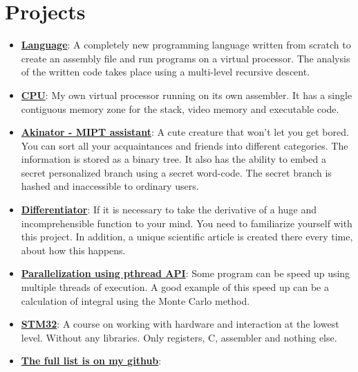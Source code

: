 \documentclass{resume}
\newcommand{\resumeItem}[2]{
  \item\small{
    \textbf{#1}{: #2 \vspace{-2pt}}
  }
}
\newcommand{\resumeSubItem}[2]{\resumeItem{#1}{#2}\vspace{-4pt}}
\newcommand{\resumeSubHeadingListStart}{\begin{itemize}[leftmargin=*]}
\newcommand{\resumeSubHeadingListEnd}{\end{itemize}}
\begin{document}
\section{Projects}
  \resumeSubHeadingListStart
    \resumeSubItem{\href{https://github.com/UniverTime/Language}{Language}}
      {A completely new programming language written from scratch to create an assembly file and run programs on a virtual processor. The analysis of the written code takes place using a multi-level recursive descent.}
      \bigskip
    \resumeSubItem{\href{https://github.com/UniverTime/CPU}{CPU}}
    {My own virtual processor running on its own assembler. It has a single contiguous memory zone for the stack, video memory and executable code.}
    \bigskip
    \resumeSubItem{\href{https://github.com/UniverTime/Akinator}{Akinator - MIPT assistant}}
      {A cute creature that won't let you get bored. You can sort all your acquaintances and friends into different categories. The information is stored as a binary tree. It also has the ability to embed a secret personalized branch using a secret word-code. The secret branch is hashed and inaccessible to ordinary users.}
      \bigskip
    \resumeSubItem{\href{https://github.com/UniverTime/Differentiator}{Differentiator}}
      {If it is necessary to take the derivative of a huge and incomprehensible function to your mind. You need to familiarize yourself with this project. In addition, a unique scientific article is created there every time, about how this happens.}
      \bigskip
    \resumeSubItem{\href{https://github.com/UniverTime/Parallelization}{Parallelization using pthread API}}
      {Some program can be speed up using multiple threads of execution. A good example of this speed up can be a calculation of integral using the Monte Carlo method.}
      \bigskip
    \resumeSubItem{\href{https://github.com/UniverTime/STM32}{STM32}}
      {A course on working with hardware and interaction at the lowest level. Without any libraries. Only registers, C, assembler and nothing else.}
      \bigskip
      \resumeSubItem{\href{https://github.com/UniverTime}{The full list is on my github}}
      {}
      
  \resumeSubHeadingListEnd
\end{document}
